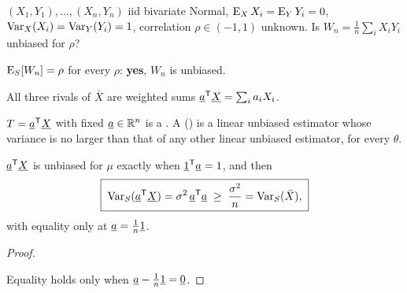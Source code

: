 \begin{example}
$(X_1,Y_1),\dots,(X_n,Y_n)$ iid bivariate Normal, $\operatorname{E}_X X_i=\operatorname{E}_Y Y_i=0$, $\operatorname{Var}_X(X_i)=\operatorname{Var}_Y(Y_i)=1$, correlation $\rho\in(-1,1)$ unknown. Is $W_n=\frac1n\sum_iX_iY_i$ unbiased for $\rho$?
\begin{deriv}
\end{deriv}
$\operatorname{E}_S[W_n]=\rho$ for every $\rho$: \textbf{yes}, $W_n$ is unbiased.
\end{example}

All three rivals of $\bar X$ are weighted sums $\underline{a}^{\mathsf{T}}\underline{X}=\sum_ia_iX_i$.

\begin{definition}
$T=\underline{a}^{\mathsf{T}}\underline{X}$ with fixed $\underline{a}\in\mathbb{R}^n$ is a . A  () is a linear unbiased estimator whose variance is no larger than that of any other linear unbiased estimator, for every $\theta$.
\end{definition}

\begin{result}
$\underline{a}^{\mathsf{T}}\underline{X}$ is unbiased for $\mu$ exactly when $\underline{1}^{\mathsf{T}}\underline{a}=1$, and then
\[
  \boxed{\;\operatorname{Var}_S(\underline{a}^{\mathsf{T}}\underline{X})=\sigma^2\,\underline{a}^{\mathsf{T}}\underline{a}\;\ge\;\frac{\sigma^2}{n}=\operatorname{Var}_S(\bar X),\;}
\]
with equality only at $\underline{a}=\frac1n\underline{1}$.
\end{result}
\begin{proof}
\begin{deriv}
\end{deriv}
Equality holds only when $\underline{a}-\frac1n\underline{1}=\underline{0}$.
\end{proof}

